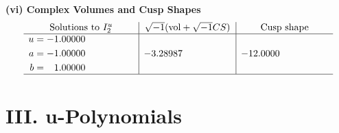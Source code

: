 \documentclass[1p]{elsarticle_modified}
\theoremstyle{definition}
\newcommand{\I}{\sqrt{-1}}
\begin{document}
\newpage\flushleft \textbf{(vi) Complex Volumes and Cusp Shapes}
$$\begin{array}{c|c|c}  
\text{Solutions to }I^u_{2}& \I (\text{vol} + \sqrt{-1}CS) & \text{Cusp shape}\\
 \hline 
\begin{aligned}
u &= -1.00000\phantom{ +0.000000I} \\
a &= -1.00000\phantom{ +0.000000I} \\
b &= \phantom{-}1.00000\phantom{ +0.000000I}\end{aligned}
 & -3.28987\phantom{ +0.000000I} & -12.0000\phantom{ +0.000000I}\\
 \hline 
 \end{array}$$\newpage
\newpage\renewcommand{\arraystretch}{1}
\centering \section*{ III. u-Polynomials}
\end{document}
